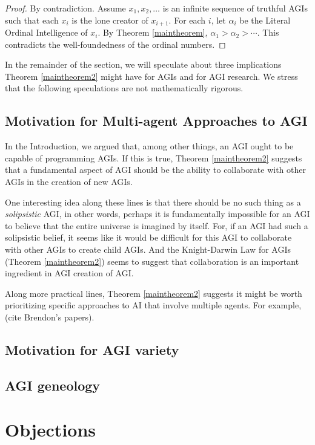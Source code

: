 \documentclass[runningheads]{llncs}
\begin{document}
\begin{proof}
By contradiction. Assume $x_1,x_2,\ldots$ is an infinite sequence of truthful AGIs such
that each $x_i$ is the lone creator of $x_{i+1}$. For each $i$, let $\alpha_i$
be the Literal Ordinal Intelligence of $x_i$. By Theorem \ref{maintheorem},
$\alpha_1>\alpha_2>\cdots$. This contradicts the well-foundedness of the ordinal
numbers.
\end{proof}

In the remainder of the section, we will speculate about three implications
Theorem \ref{maintheorem2} might have for AGIs and for AGI research.
We stress that the following speculations are not mathematically rigorous.

\subsection{Motivation for Multi-agent Approaches to AGI}

In the Introduction, we argued that, among other things, an AGI ought to be
capable of programming AGIs. If this is true, Theorem \ref{maintheorem2} suggests
that a fundamental aspect of AGI should be the ability to collaborate with other
AGIs in the creation of new AGIs.

One interesting idea along these lines is that there should be no
such thing as a \emph{solipsistic} AGI, in other words, perhaps it is
fundamentally impossible for an AGI to believe that the entire universe
is imagined by itself. For, if an AGI had such a solipsistic belief, it
seems like it would be difficult for this AGI to collaborate with other AGIs
to create child AGIs. And the Knight-Darwin Law for AGIs (Theorem \ref{maintheorem2})
seems to suggest that collaboration is an important ingredient in AGI creation of AGI.

Along more practical lines, Theorem \ref{maintheorem2} suggests it might be worth
prioritizing specific approaches to AI that involve multiple agents. For example,
(cite Brendon's papers).

\subsection{Motivation for AGI variety}



\subsection{AGI geneology}


\section{Objections}
\label{objectionsection}



\end{document}
